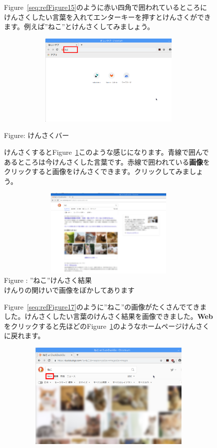 \documentclass[a4paper,12pt]{jarticle}
\begin{document}
\begin{figure}
  Figure~\ref{seq:refFigure15}のように赤い四角で囲われているところにけんさくしたい言葉を入れてエンターキーを押すとけんさくができます。例えば”ねこ”とけんさくしてみましょう。
  \centering
  {\upshape
    \includegraphics[width=12.023cm,height=4.447cm]{textbook-img077.png}

    Figure{\theFigure\label{seq:refFigure15}}: けんさくバー}


  \flushleft
  けんさくするとFigure~\ref{seq:refFigure16}このような感じになります。青線で囲んであるところは今けんさくした言葉です。赤線で囲われている\textbf{画像}をクリックすると画像をけんさくできます。クリックしてみましょう。


  \centering
  {\upshape
    \includegraphics[width=12.123cm,height=4.299cm]{textbook-img078.png}
    \newline
    Figure {\theFigure\label{seq:refFigure16}}:
    ”ねこ”けんさく結果\\
    けんりの関けいで画像をぼかしてあります}

  \flushleft
  Figure~\ref{seq:refFigure17}のように”ねこ”の画像がたくさんでてきました。けんさくしたい言葉のけんさく結果を画像できました。\textbf{Web}をクリックすると先ほどのFigure~\ref{seq:refFigure16}のようなホームページけんさくに戻れます。


  \centering
  \begin{minipage}{13.762cm}
    \includegraphics[width=13.892cm,height=5.156cm]{textbook-img079.png}


\end{minipage}
\end{figure}
\end{document}

